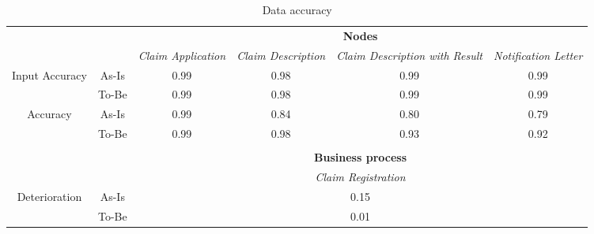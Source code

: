 \begin{center}
\begin{table}[H]
\begin{tabular}{|c|c|p{2cm}|p{2.5cm}|p{2.5cm}|p{2.5cm}|}


\cline{3-6}
\multicolumn{2}{c}{} & \multicolumn{4}{|c|}{\textbf{Nodes}} \\ \cline{3-6}
\multicolumn{2}{c|}{} & \textsl{Claim Application} & \textsl{Claim Description} & \textsl{Claim Description with Result} & \textsl{Notification Letter}\\
\hline
\multirow{2}{*}{Input Accuracy} & As-Is & \multicolumn{1}{c|}{0.99} & \multicolumn{1}{c|}{0.98} & \multicolumn{1}{c|}{0.99} & \multicolumn{1}{c|}{0.99}\\ \cline{2-6}
								& To-Be & \multicolumn{1}{c|}{0.99} & \multicolumn{1}{c|}{0.98} & \multicolumn{1}{c|}{0.99} & \multicolumn{1}{c|}{0.99}\\ \hline

\multirow{2}{*}{Accuracy} 		& As-Is & \multicolumn{1}{c|}{0.99} & \multicolumn{1}{c|}{0.84} & \multicolumn{1}{c|}{0.80} & \multicolumn{1}{c|}{0.79}\\ \cline{2-6}
								& To-Be & \multicolumn{1}{c|}{0.99} & \multicolumn{1}{c|}{0.98} & \multicolumn{1}{c|}{0.93} & \multicolumn{1}{c|}{0.92}\\ \hline

\multicolumn{6}{c}{} \\ \cline{3-6}
\multicolumn{2}{c}{} & \multicolumn{4}{|c|}{\textbf{Business process}} \\ \cline{3-6}
\multicolumn{2}{c|}{} & \multicolumn{4}{|c|}{\textsl{Claim Registration}} \\ \hline
\multirow{2}{*}{Deterioration} & As-Is & \multicolumn{4}{|c|}{0.15}\\ \cline{2-6}
							   & To-Be & \multicolumn{4}{|c|}{0.01}\\ \hline
\end{tabular}
\caption{Data accuracy}
\label{tab:data_accuracy}
\end{table}
\end{center}